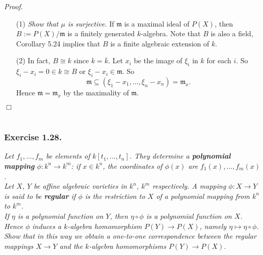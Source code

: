 \documentclass{article}
\begin{document}
\emph{Proof.}
\begin{enumerate}
\item[(1)]
  \emph{Show that $\mu$ is surjective.}
  If $\mathfrak{m}$ is a maximal ideal of $P(X)$,
  then $B := P(X)/\mathfrak{m}$ is a finitely generated $k$-algebra.
  Note that $B$ is also a field,
  Corollary 5.24 implies that $B$ is a finite algebraic extension of $k$.

\item[(2)]
  In fact, $B \cong k$ since $k = \overline{k}$.
  Let $x_i$ be the image of $\xi_i$ in $k$ for each $i$.
  So $\xi_i - x_i = 0 \in k \cong B$ or $\xi_i - x_i \in \mathfrak{m}$.
  So
  \[
    \mathfrak{m} \subseteq (\xi_1 - x_1, \ldots, \xi_n - x_n) = \mathfrak{m}_x.
  \]
  Hence $\mathfrak{m} = \mathfrak{m}_x$ by the maximality of $\mathfrak{m}$.
\end{enumerate}
$\Box$ \\\\






\subsubsection*{Exercise 1.28.}
\emph{Let $f_1, \ldots, f_m$ be elements of $k[t_1, \ldots, t_n]$.
They determine a \textbf{polynomial mapping} $\phi: k^n \to k^m$:
if $x \in k^n$, the coordinates of $\phi(x)$ are $f_1(x), \ldots, f_m(x)$.} \\

\emph{Let $X$, $Y$ be affine algebraic varieties in $k^n$, $k^m$ respectively.
A mapping $\phi: X \to Y$ is said to be \textbf{regular}
if $\phi$ is the restriction to $X$ of a polynomial mapping from $k^n$ to $k^m$.} \\

\emph{If $\eta$ is a polynomial function on $Y$, then $\eta \circ \phi$ is a polynomial function on $X$.
Hence $\phi$ induces a $k$-algebra homomorphism $P(Y) \to P(X)$, namely $\eta \mapsto \eta \circ \phi$.
Show that in this way we obtain a one-to-one correspondence between
the regular mappings $X \to Y$ and the $k$-algebra homomorphisms $P(Y) \to P(X)$.} \\
\end{document}
